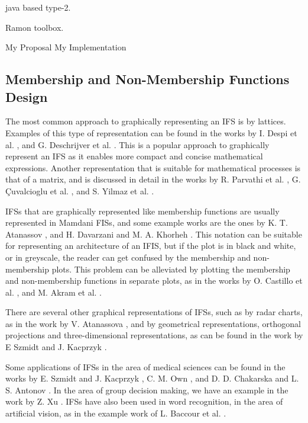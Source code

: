 
\cite{Wagner2013} java based type-2.

\cite{castro2007interval} Ramon toolbox.

\cite{Hernandez-aguila2016} My Proposal
\cite{Hernandez-Aguila2017} My Implementation

\subsection{Membership and Non-Membership Functions Design}
\label{subsection:related-work-membership-and-non-membership-functions-design}

The most common approach to graphically representing an IFS is by
lattices. Examples of this type of representation can be found in the works by
I. Despi et al. \cite{Despi2013}, and G. Deschrijver et
al. \cite{Deschrijver2004}. This is a popular approach to graphically represent
an IFS as it enables more compact and concise mathematical expressions. Another
representation that is suitable for mathematical processes is that of a matrix,
and is discussed in detail in the works by R. Parvathi et
al. \cite{Parvathi2014}, G. Çuvalcioglu et al. \cite{Yilmaz2015}, and S. Yilmaz
et al. \cite{Yilmaz2015a}.

IFSs that are graphically represented like membership functions are usually
represented in Mamdani FISs, and some example works are the ones by
K. T. Atanassov \cite{Atanassov1986}, and H. Davarzani and M. A. Khorheh
\cite{Davarzani2013}. This notation can be suitable for representing an
architecture of an IFIS, but if the plot is in black and white, or in greyscale,
the reader can get confused by the membership and non-membership plots. This
problem can be alleviated by plotting the membership and non-membership
functions in separate plots, as in the works by O. Castillo et
al. \cite{castillo2007intuitionistic}, and M. Akram et al. \cite{Akram2014}.

There are several other graphical representations of IFSs, such as by radar
charts, as in the work by V. Atanassova \cite{Atanassova2010}, and by
geometrical representations, orthogonal projections and three-dimensional
representations, as can be found in the work by E Szmidt and J. Kacprzyk
\cite{Szmidt2000}.

Some applications of IFSs in the area of medical sciences can be found in the
works by E. Szmidt and J. Kacprzyk \cite{Szmidt2001}, C. M. Own \cite{Own2009},
and D. D. Chakarska and L. S. Antonov \cite{Antonov1995}. In the area of group
decision making, we have an example in the work by Z. Xu \cite{Xu2007}. IFSs
have also been used in word recognition, in the area of artificial vision, as in
the example work of L. Baccour et al. \cite{Baccour2008}.

